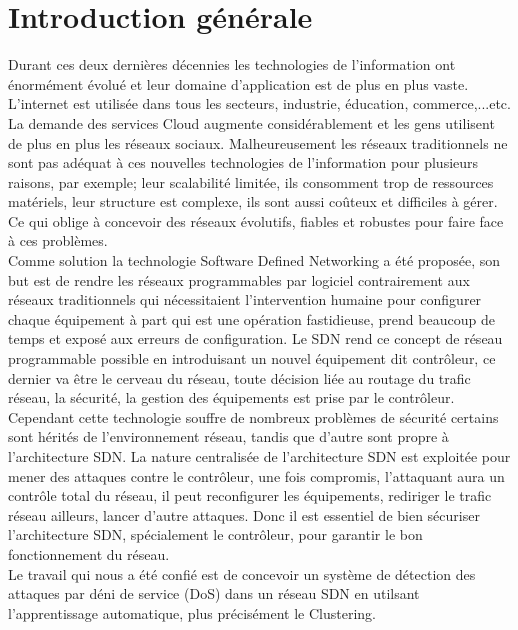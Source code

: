 
\chapter{Introduction générale} 

\label{Introduction} 
Durant ces deux dernières décennies les technologies de l’information ont  énormément évolué et leur domaine d’application est de plus en plus vaste. L’internet est utilisée dans tous les secteurs, industrie, éducation, commerce,...etc. La demande des services Cloud augmente considérablement et les gens utilisent de plus en plus les réseaux sociaux. Malheureusement les réseaux traditionnels ne sont pas adéquat à ces nouvelles technologies de l’information  pour plusieurs raisons, par exemple; leur scalabilité limitée, ils consomment trop de ressources matériels,  leur structure est complexe, ils sont aussi coûteux et difficiles à gérer.  Ce qui oblige à concevoir des réseaux évolutifs, fiables et robustes pour faire face à ces problèmes.\\

	Comme solution la technologie Software Defined Networking a été proposée, son but est de rendre les réseaux programmables par logiciel contrairement aux réseaux traditionnels qui nécessitaient l’intervention humaine  pour configurer chaque équipement à part qui est une opération fastidieuse, prend beaucoup de temps et exposé aux erreurs de configuration. Le SDN rend ce concept de réseau programmable possible en introduisant un nouvel équipement dit contrôleur, ce dernier va être le cerveau du réseau, toute décision liée au routage du trafic réseau, la sécurité, la gestion des équipements est prise par le contrôleur.\\
	
	Cependant cette technologie souffre de nombreux problèmes de sécurité certains sont hérités de l’environnement réseau, tandis que d’autre sont propre à l’architecture SDN. La nature centralisée de l’architecture SDN est exploitée pour mener des attaques contre le contrôleur, une fois compromis, l’attaquant aura un contrôle total du réseau, il peut reconfigurer les équipements, rediriger le trafic réseau ailleurs, lancer d’autre attaques. Donc il est essentiel de bien sécuriser l'architecture SDN, spécialement le contrôleur, pour garantir le bon fonctionnement du réseau.\\
	
	Le travail qui nous a été confié est de concevoir un système de détection des attaques par déni de service (DoS) dans un réseau SDN en utilsant l'apprentissage automatique, plus précisément le Clustering.\\
		
